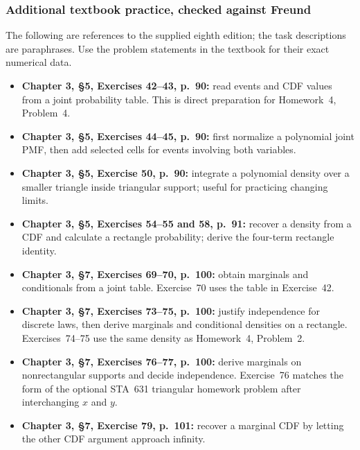 \subsubsection*{Additional textbook practice, checked against Freund}
The following are references to the supplied eighth edition; the task descriptions are paraphrases. Use the problem statements in the textbook for their exact numerical data.
\begin{itemize}[leftmargin=*]
\item \textbf{Chapter 3, \S5, Exercises 42--43, p.~90:} read events and CDF values from a joint probability table. This is direct preparation for Homework~4, Problem~4.
\item \textbf{Chapter 3, \S5, Exercises 44--45, p.~90:} first normalize a polynomial joint PMF, then add selected cells for events involving both variables.
\item \textbf{Chapter 3, \S5, Exercise 50, p.~90:} integrate a polynomial density over a smaller triangle inside triangular support; useful for practicing changing limits.
\item \textbf{Chapter 3, \S5, Exercises 54--55 and 58, p.~91:} recover a density from a CDF and calculate a rectangle probability; derive the four-term rectangle identity.
\item \textbf{Chapter 3, \S7, Exercises 69--70, p.~100:} obtain marginals and conditionals from a joint table. Exercise~70 uses the table in Exercise~42.
\item \textbf{Chapter 3, \S7, Exercises 73--75, p.~100:} justify independence for discrete laws, then derive marginals and conditional densities on a rectangle. Exercises~74--75 use the same density as Homework~4, Problem~2.
\item \textbf{Chapter 3, \S7, Exercises 76--77, p.~100:} derive marginals on nonrectangular supports and decide independence. Exercise~76 matches the form of the optional STA~631 triangular homework problem after interchanging $x$ and $y$.
\item \textbf{Chapter 3, \S7, Exercise 79, p.~101:} recover a marginal CDF by letting the other CDF argument approach infinity.
\end{itemize}

